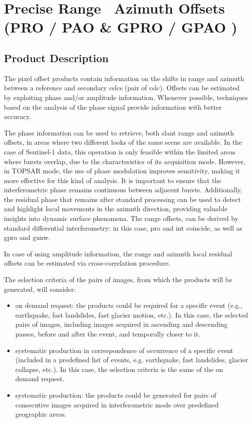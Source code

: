 \section{Precise Range \ Azimuth Offsets (PRO / PAO \& GPRO / GPAO )}

\subsection{Product Description}
\label{sec:pro_pao_prod_description}
The pixel offset products contain information on the shifts in range and azimuth between a reference and secondary \acs{cslc}s (pair of \acs{cslc}). Offsets can be estimated by exploiting phase and/or amplitude information. Whenever possible, techniques based on the analysis of the phase signal provide information with better accuracy. 

The phase information can be used to retrieve, both slant range and azimuth offsets, in areas where two different looks of the same scene are available. In the case of Sentinel-1 data, this operation is only feasible within the limited areas where bursts overlap, due to the characteristics of its acquisition mode. However, in TOPSAR mode, the use of phase modulation improves sensitivity, making it more effective for this kind of analysis. It is important to ensure that the interferometric phase remains continuous between adjacent bursts. Additionally, the residual phase that remains after standard processing can be used to detect and highlight local movements in the azimuth direction, providing valuable insights into dynamic surface phenomena. The range offsets, can be derived by standard differential interferometry: in this case, \acs{pro} and \acs{int} coincide, as well as \acs{gpro} and \acs{gunw}.

In case of using amplitude information, the range and azimuth local residual offsets can be estimated via cross-correlation procedure.

The selection criteria of the pairs of images, from which the products will be generated, will consider:
\begin{itemize}
    \item on demand request: the products could be required for a specific event (e.g., earthquake, fast landslides, fast glacier motion, etc.). In this case, the selected pairs of images, including images acquired in ascending and descending passes, before and after the event, and temporally closer to it.
    \item systematic production in correspondence of occurrence of a specific event (included in a predefined list of events, e.g. earthquake, fast landslides, glacier collapse, etc.). In this case, the selection criteria is the same of the on demand request.
    \item systematic production: the products could be generated for pairs of consecutive images acquired in interferometric mode over predefined geographic areas.
\end{itemize}

